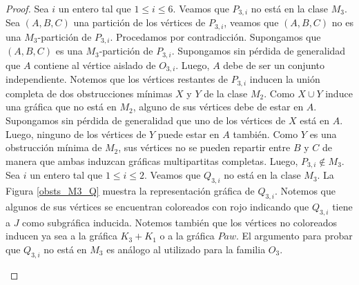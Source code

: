 \begin{proof}
Sea $i$ un entero tal que $1\le i \le 6$. Veamos que $P_{3,i}$ no está en la clase $M_3$. Sea $(A,B,C)$ una partición de los vértices de $P_{3,i}$, veamos que $(A,B,C)$ no es una $M_3$-partición de $P_{3,i}$. Procedamos por contradicción. Supongamos que $(A,B,C)$ es una $M_3$-partición de $P_{3,i}$. Supongamos sin pérdida de generalidad que $A$ contiene al vértice aislado de $O_{3,i}$. Luego, $A$ debe de ser un conjunto independiente. Notemos que los vértices restantes de $P_{3,i}$ inducen la unión completa de dos obstrucciones mínimas $X$ y $Y$ de la clase $M_2$. Como $X\cup Y$ induce una gráfica que no está en $M_2$, alguno de sus vértices debe de estar en $A$. Supongamos sin pérdida de generalidad que uno de los vértices de $X$ está en $A$. Luego, ninguno de los vértices de $Y$ puede estar en $A$ también. Como $Y$ es una obstrucción mínima de $M_2$, sus vértices no se pueden repartir entre $B$ y $C$ de manera que ambas induzcan gráficas multipartitas completas. Luego, $P_{3,i}\notin M_3$. 
Sea $i$ un entero tal que $1\le i \le 2$. Veamos que $Q_{3,i}$ no está en la clase $M_3$. La Figura \ref{obsts_M3_Q} muestra la representación gráfica de $Q_{3,i}$. Notemos que algunos de sus vértices se encuentran coloreados con rojo indicando que $Q_{3,i}$ tiene a $J$ como subgráfica inducida. Notemos también que los vértices no coloreados inducen ya sea a la gráfica $K_3+K_1$ o a la gráfica $Paw$. El argumento para probar que $Q_{3,i}$ no está en $M_3$ es análogo al utilizado para la familia $O_3$.

\begin{figure}[ht!]

\begin{subfigure}{\textwidth}
\begin{center}
\end{center}
\end{subfigure}
\end{figure}
\end{proof}
